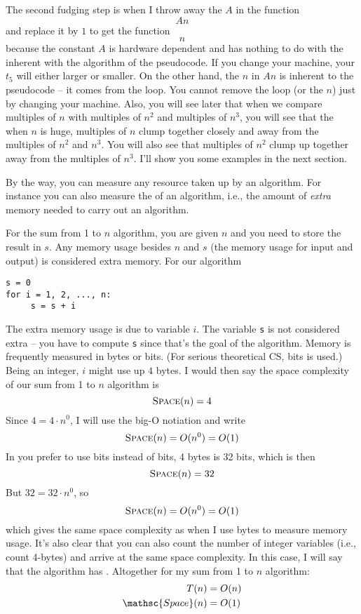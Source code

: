 The second fudging step is when I throw away the $A$ 
in the function
\[
An
\]
and replace it by $1$ to get the function
\[
n
\]
because
the constant $A$ is hardware dependent
and has nothing to do with the inherent with the algorithm of the
pseudocode.
If you change your machine, your $t_5$ will either larger or smaller.
On the other hand, the $n$ in $An$ is inherent to the pseudocode -- it comes
from the loop.
You cannot remove the loop (or the $n$) just by changing your machine.
%
%
%
Also,
you will see later that when we compare multiples of $n$ with
multiples of $n^2$ and multiples of $n^3$, you will see that the
when $n$ is huge,
multiples of $n$ clump together closely and away from the multiples of
$n^2$ and $n^3$.
You will also see that multiples of $n^2$ clump up together away from the 
multiples of $n^3$.
I'll show you some examples in the next section.

By the way, you can measure any resource taken up by an algorithm.
For instance you can also measure the  of an
algorithm, i.e., the amount of \textit{extra} memory needed to carry out 
an algorithm.

For the sum from 1 to $n$ algorithm, you are given $n$
and you need to store the result in $s$.
Any memory usage besides $n$ and $s$ (the memory
usage for input and output) is considered extra memory.
For our algorithm
\begin{Verbatim}[frame=single, fontsize=\footnotesize]
s = 0
for i = 1, 2, ..., n:
     s = s + i
\end{Verbatim}
The extra memory usage is due to variable $i$.
The variable \verb!s! is not considered extra -- you have to compute
\verb!s! since that's the goal of the algorithm.
Memory is frequently measured in bytes or bits.
(For serious theoretical CS, bits is used.)
Being an integer, $i$ might use up $4$ bytes.
I would then say the space complexity of our sum from 1 to $n$ algorithm is
\[
\textsc{Space}(n) = 4
\]
Since $4 = 4 \cdot n^0$, I will use the big-O notiation and write
\[
\textsc{Space}(n) = O(n^0) = O(1)
\]
In you prefer to use bits instead of bits, 4 bytes is 32 bits, which is then
\[
\textsc{Space}(n) = 32
\]
But $32 = 32 \cdot n^0$, so
\[
\textsc{Space}(n) = O(n^0) = O(1)
\]
which gives the same space complexity as when I use bytes to measure
memory usage.
It's also clear that you can also count the number of integer variables
(i.e., count 4-bytes) and arrive at the same space complexity.
In this case, I will say that the algorithm has
.
Altogether for my sum from 1 to $n$ algorithm:
\begin{align*}
  T(n) &= O(n) \\
  \mathsc{Space}(n) &= O(1)
\end{align*}
  
